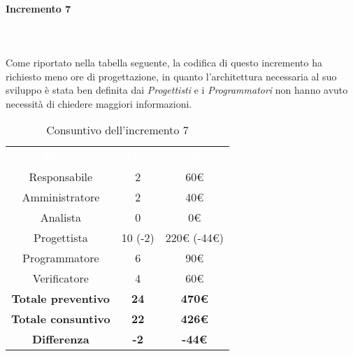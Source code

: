 \paragraph*{Incremento 7} \mbox{} \\ \mbox{} \\
Come riportato nella tabella seguente, la codifica di questo incremento ha richiesto meno ore di progettazione, in quanto l'architettura necessaria al suo sviluppo è stata ben definita dai \textit{Progettisti} e i \textit{Programmatori} non hanno avuto necessità di chiedere maggiori informazioni.
\begin{table}[H]
\centering\renewcommand{\arraystretch}{1.5}
\caption{Consuntivo dell'incremento 7}
\vspace{0.2cm}
\begin{tabular}{ c c c }
\rowcolor{redafk}
\textcolor{white}{\textbf{Ruolo}} & \textcolor{white}{\textbf{Ore}} &
\textcolor{white}{\textbf{Costo}}  \\
Responsabile 	& 2 & 60€ \\
Amministratore 	& 2 &  40€ \\
Analista 		& 0  & 0€ \\
Progettista		& 10 (-2)  & 220€ (-44€) \\
Programmatore	&  6 & 90€ \\
Verificatore 	&  4 & 60€ \\
\textbf{Totale preventivo} & \textbf{24} & \textbf{470€}  \\
\textbf{Totale consuntivo} & \textbf{22} & \textbf{426€}  \\
\rowcolor{lastrowcolor}
\textbf{Differenza} & \textbf{-2} & \textbf{-44€} \\
\end{tabular}
\end{table}

